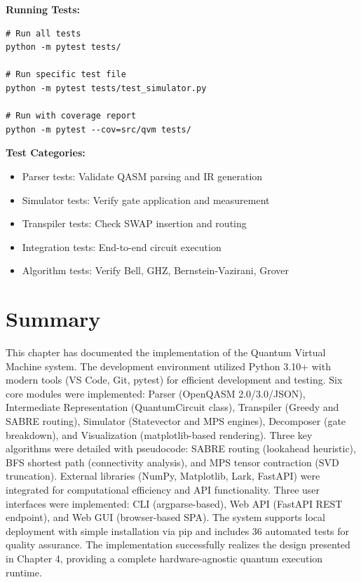 \textbf{Running Tests:}
\begin{verbatim}
# Run all tests
python -m pytest tests/

# Run specific test file
python -m pytest tests/test_simulator.py

# Run with coverage report
python -m pytest --cov=src/qvm tests/
\end{verbatim}

\textbf{Test Categories:}
\begin{itemize}
\item Parser tests: Validate QASM parsing and IR generation
\item Simulator tests: Verify gate application and measurement
\item Transpiler tests: Check SWAP insertion and routing
\item Integration tests: End-to-end circuit execution
\item Algorithm tests: Verify Bell, GHZ, Bernstein-Vazirani, Grover
\end{itemize}

\section{Summary}
This chapter has documented the implementation of the Quantum Virtual Machine system. The development environment utilized Python 3.10+ with modern tools (VS Code, Git, pytest) for efficient development and testing. Six core modules were implemented: Parser (OpenQASM 2.0/3.0/JSON), Intermediate Representation (QuantumCircuit class), Transpiler (Greedy and SABRE routing), Simulator (Statevector and MPS engines), Decomposer (gate breakdown), and Visualization (matplotlib-based rendering). Three key algorithms were detailed with pseudocode: SABRE routing (lookahead heuristic), BFS shortest path (connectivity analysis), and MPS tensor contraction (SVD truncation). External libraries (NumPy, Matplotlib, Lark, FastAPI) were integrated for computational efficiency and API functionality. Three user interfaces were implemented: CLI (argparse-based), Web API (FastAPI REST endpoint), and Web GUI (browser-based SPA). The system supports local deployment with simple installation via pip and includes 36 automated tests for quality assurance. The implementation successfully realizes the design presented in Chapter 4, providing a complete hardware-agnostic quantum execution runtime.
